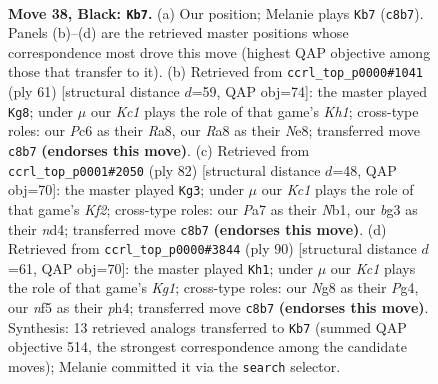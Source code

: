 \documentclass[11pt]{article}
\begin{document}
\clearpage

\begin{figure}[p]\centering
\begin{subfigure}{0.46\textwidth}\centering
\resizebox{\linewidth}{!}{%
\newchessgame
\chessboard[
  setfen={r1kR2nb/p6p/r1p2p2/2P2N2/4P3/6B1/8/3R2K1 b - - 1 38},
  showmover=false,
  pgfstyle=straightmove, color=movearrow, markmove={c8-b7}
]}
\caption{}
\end{subfigure}\hfill
\begin{subfigure}{0.46\textwidth}\centering
\resizebox{\linewidth}{!}{%
\newchessgame
\chessboard[
  setfen={r3n2k/1pp4R/3p4/3P2r1/1P6/p1N5/P1K5/7R b - - 0 31},
  showmover=false,
  pgfstyle=straightmove, color=movearrow, markmove={h8-g8}
]}
\caption{}
\end{subfigure}
\\[4pt]
\begin{subfigure}{0.46\textwidth}\centering
\resizebox{\linewidth}{!}{%
\newchessgame
\chessboard[
  setfen={8/p2r2k1/P7/2R3P1/1p1n1P1R/8/4rKP1/1N6 w - - 1 42},
  showmover=false,
  pgfstyle=straightmove, color=movearrow, markmove={f2-g3}
]}
\caption{}
\end{subfigure}\hfill
\begin{subfigure}{0.46\textwidth}\centering
\resizebox{\linewidth}{!}{%
\newchessgame
\chessboard[
  setfen={5k2/5p2/PR6/6p1/6Pp/7P/1Pr3r1/R5K1 w - - 1 46},
  showmover=false,
  pgfstyle=straightmove, color=movearrow, markmove={g1-h1}
]}
\caption{}
\end{subfigure}
\caption{\textbf{Move 38, Black: \texttt{Kb7}.} (a) Our position; Melanie plays \texttt{Kb7} (\texttt{c8b7}). Panels (b)--(d) are the retrieved master positions whose correspondence most drove this move (highest QAP objective among those that transfer to it). (b) Retrieved from \texttt{ccrl\_top\_p0000\#1041} (ply 61) [structural distance $d$=59, QAP obj=74]: the master played \texttt{Kg8}; under $\mu$ our \emph{Kc1} plays the role of that game's \emph{Kh1}; cross-type roles: our \emph{P}c6 as their \emph{R}a8, our \emph{R}a8 as their \emph{N}e8; transferred move \texttt{c8b7} \textbf{(endorses this move)}. (c) Retrieved from \texttt{ccrl\_top\_p0001\#2050} (ply 82) [structural distance $d$=48, QAP obj=70]: the master played \texttt{Kg3}; under $\mu$ our \emph{Kc1} plays the role of that game's \emph{Kf2}; cross-type roles: our \emph{P}a7 as their \emph{N}b1, our \emph{b}g3 as their \emph{n}d4; transferred move \texttt{c8b7} \textbf{(endorses this move)}. (d) Retrieved from \texttt{ccrl\_top\_p0000\#3844} (ply 90) [structural distance $d$=61, QAP obj=70]: the master played \texttt{Kh1}; under $\mu$ our \emph{Kc1} plays the role of that game's \emph{Kg1}; cross-type roles: our \emph{N}g8 as their \emph{P}g4, our \emph{n}f5 as their \emph{p}h4; transferred move \texttt{c8b7} \textbf{(endorses this move)}. Synthesis: 13 retrieved analogs transferred to \texttt{Kb7} (summed QAP objective 514, the strongest correspondence among the candidate moves); Melanie committed it via the \texttt{search} selector.}
\label{fig:thought-m75}
\end{figure}
\end{document}
